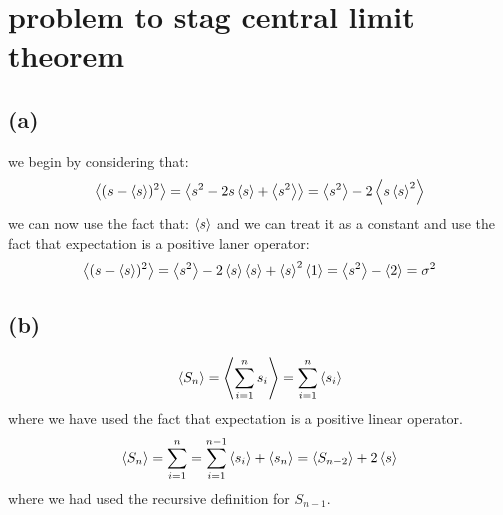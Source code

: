\documentclass{article}
\begin{document}
\section{problem to stag central limit theorem}
\subsection{(a)}
we begin by considering that:
\begin{equation}
    \expval{(s-\expval{s})^{2}}=\expval{s^{2}-2s\expval{s}+\expval{s^{2}}} =\expval{s^{2}}-2\expval{s\expval{s}^{2}}
\end{equation}
we can now use the fact that: $\expval{s}$ and we can treat it as a constant and use the fact that expectation is a positive laner operator:
\begin{equation}
    \expval{(s-\expval{s})^{2}}=\expval{s^{2}}-2\expval{s}\expval{s}+\expval{s}^{2}\expval{1}=\expval{s^{2}}-\expval{2}=\sigma ^{2}
\end{equation}
\subsection{(b)}
\begin{equation}
    \expval{S_{n}}=\expval{\sum_{i=1}^{n} s_{i}}=\sum_{i=1}^{n} \expval{s_{i}}
\end{equation}
where we have used the fact that expectation is a positive linear operator.
\begin{equation}
    \expval{S_{n}}=\sum_{i=1}^{n} =\sum_{i=1}^{n-1} \expval{s_{i}}+\expval{s_{n}}=\expval{S_{n-2}}+2\expval{s}
\end{equation}
where we had used the recursive definition for $S_{n-1}$. 
\end{document}
